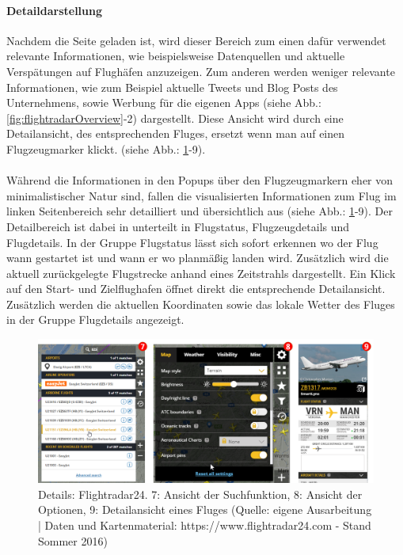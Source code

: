 \documentclass[../Bachelorarbeit.tex]{subfiles}
\begin{document}
\paragraph{Detaildarstellung}
\label{flightradarDetaildarstellung}
Nachdem die Seite geladen ist, wird dieser Bereich zum einen dafür verwendet  relevante Informationen, wie beispielsweise  Datenquellen und aktuelle Verspätungen auf Flughäfen anzuzeigen.
Zum anderen werden weniger relevante Informationen, wie zum Beispiel aktuelle Tweets und Blog Posts des Unternehmens, sowie Werbung für die eigenen Apps (siehe Abb.: \ref{fig:flightradarOverview}-2) dargestellt. 
Diese Ansicht wird durch eine Detailansicht, des entsprechenden Fluges, ersetzt wenn man auf einen Flugzeugmarker klickt. (siehe Abb.: \ref{fig:flightradarDetail}-9).\\
\\
Während die Informationen in den Popups über den Flugzeugmarkern eher von minimalistischer Natur sind, fallen die visualisierten Informationen zum Flug im linken Seitenbereich sehr detailliert und übersichtlich aus (siehe Abb.: \ref{fig:flightradarDetail}-9). 
Der Detailbereich ist dabei in unterteilt in Flugstatus, Flugzeugdetails und Flugdetails.
In der Gruppe Flugstatus lässt sich sofort erkennen wo der Flug wann gestartet ist und wann er wo planmäßig landen wird. Zusätzlich wird die aktuell zurückgelegte Flugstrecke anhand eines Zeitstrahls dargestellt.
Ein Klick auf den Start- und Zielflughafen öffnet direkt die entsprechende Detailansicht.
Zusätzlich werden die aktuellen Koordinaten sowie das lokale Wetter des Fluges in der Gruppe Flugdetails angezeigt. 

\begin{figure}[H]
\centering
\includegraphics[width=1\linewidth]{img/StandDerTechnik/flightradarDetail}
\caption[Details: Flightradar24]{Details: Flightradar24. 7: Ansicht der Suchfunktion, 8: Ansicht der Optionen, 9: Detailansicht eines Fluges (Quelle: eigene Ausarbeitung | Daten und Kartenmaterial: https://www.flightradar24.com - Stand Sommer 2016)}
\label{fig:flightradarDetail}
\end{figure}
\end{document}
